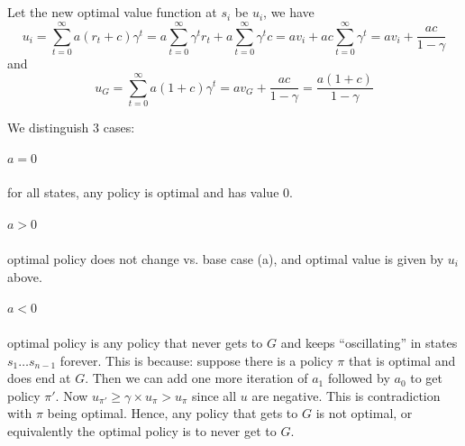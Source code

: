 \subsection{}
Let the new optimal value function at $s_i$ be $u_i$, we have
\begin{equation*}
u_i = \sum_{t=0}^{\infty} a(r_t + c)\gamma^t = a\sum_{t=0}^{\infty} \gamma^t r_t + a\sum_{t=0}^{\infty} \gamma^t c = av_i + ac\sum_{t=0}^{\infty} \gamma^t = av_i + \frac{ac}{1-\gamma}
\end{equation*}
and 
\begin{equation*}
u_G = \sum_{t=0}^{\infty} a(1 + c)\gamma^t = av_G + \frac{ac}{1-\gamma} = \frac{a(1+c)}{1-\gamma}
\end{equation*}

We distinguish 3 cases:
\subparagraph{$a=0$} for all states, any policy is optimal and has value 0.
\subparagraph{$a>0$} optimal policy does not change vs. base case (a), and optimal value is given by $u_i$ above.
\subparagraph{$a<0$} optimal policy is any policy that never gets to $G$ and keeps ``oscillating'' in states $s_1\ldots s_{n-1}$ forever. This is because: suppose there is a policy $\pi$ that is optimal and does end at $G$. Then we can add one more iteration of $a_1$ followed by $a_0$ to get policy $\pi'$. Now $u_{\pi'} \geq \gamma \times u_{\pi} > u_{\pi}$ since all $u$ are negative. This is contradiction with $\pi$ being optimal. Hence, any policy that gets to $G$ is not optimal, or equivalently the optimal policy is to never get to $G$.
